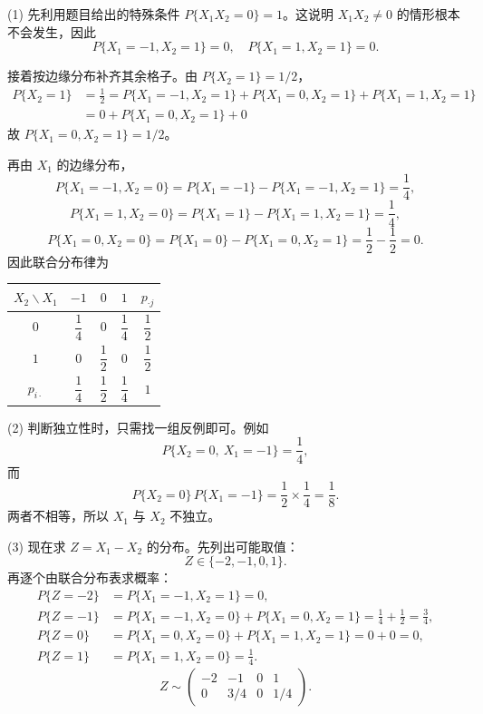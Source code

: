 ﻿\documentclass[lang=cn,11pt]{elegantbook}
\begin{document}
\begin{solution}
(1) 先利用题目给出的特殊条件 $P\{X_1X_2=0\}=1$。这说明 $X_1X_2\neq 0$ 的情形根本不会发生，因此
\[
P\{X_1 = -1, X_2 = 1\} = 0, \quad P\{X_1 = 1, X_2 = 1\} = 0.
\]

接着按边缘分布补齐其余格子。由 $P\{X_2=1\}=1/2$，
\begin{align*}
    P\{X_2 = 1\} &= \frac{1}{2} = P\{X_1=-1,X_2=1\} + P\{X_1=0,X_2=1\} + P\{X_1=1,X_2=1\} \\
    &= 0 + P\{X_1=0,X_2=1\} + 0
\end{align*}
故 $P\{X_1=0, X_2=1\} = 1/2$。

再由 $X_1$ 的边缘分布，
\[
P\{X_1=-1,X_2=0\}=P\{X_1=-1\}-P\{X_1=-1,X_2=1\}=\frac{1}{4},
\]
\[
P\{X_1=1,X_2=0\}=P\{X_1=1\}-P\{X_1=1,X_2=1\}=\frac{1}{4},
\]
\[
P\{X_1=0,X_2=0\}=P\{X_1=0\}-P\{X_1=0,X_2=1\}=\frac{1}{2}-\frac{1}{2}=0.
\]
因此联合分布律为
\begin{center}
\begin{tabular}{c|ccc|c}
\toprule
$X_2 \backslash X_1$ & $-1$ & $0$ & $1$ & $p_{\cdot j}$ \\
\midrule
$0$ & $\dfrac{1}{4}$ & $0$ & $\dfrac{1}{4}$ & $\dfrac{1}{2}$ \\[6pt]
$1$ & $0$ & $\dfrac{1}{2}$ & $0$ & $\dfrac{1}{2}$ \\
\midrule
$p_{i\cdot}$ & $\dfrac{1}{4}$ & $\dfrac{1}{2}$ & $\dfrac{1}{4}$ & $1$ \\
\bottomrule
\end{tabular}
\end{center}

(2) 判断独立性时，只需找一组反例即可。例如
\[
P\{X_2=0,\ X_1=-1\}=\frac{1}{4},
\]
而
\[
P\{X_2=0\}\,P\{X_1=-1\}
=\frac{1}{2}\times\frac{1}{4}
=\frac{1}{8}.
\]
两者不相等，所以 $X_1$ 与 $X_2$ 不独立。

(3) 现在求 $Z=X_1-X_2$ 的分布。先列出可能取值：
\[
Z\in\{-2,-1,0,1\}.
\]
再逐个由联合分布表求概率：
\begin{align*}
    P\{Z = -2\} &= P\{X_1 = -1, X_2 = 1\} = 0, \\
    P\{Z = -1\} &= P\{X_1 = -1, X_2 = 0\} + P\{X_1 = 0, X_2 = 1\} = \frac{1}{4} + \frac{1}{2} = \frac{3}{4}, \\
    P\{Z = 0\} &= P\{X_1 = 0, X_2 = 0\} + P\{X_1 = 1, X_2 = 1\} = 0 + 0 = 0, \\
P\{Z = 1\} &= P\{X_1 = 1, X_2 = 0\} = \frac{1}{4}.
\end{align*}
\[
Z \sim \begin{pmatrix} -2 & -1 & 0 & 1 \\ 0 & 3/4 & 0 & 1/4 \end{pmatrix}.
\]
\end{solution}
\end{document}
